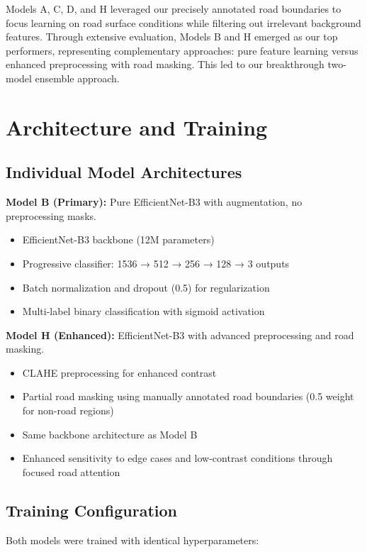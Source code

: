 \documentclass[12pt,twocolumn]{article}
\begin{document}
Models A, C, D, and H leveraged our precisely annotated road boundaries to focus learning on road surface conditions while filtering out irrelevant background features. Through extensive evaluation, Models B and H emerged as our top performers, representing complementary approaches: pure feature learning versus enhanced preprocessing with road masking. This led to our breakthrough two-model ensemble approach.

\section{Architecture and Training}

\subsection{Individual Model Architectures}

\textbf{Model B (Primary):} Pure EfficientNet-B3 with augmentation, no preprocessing masks.
\begin{itemize}[itemsep=1pt,parsep=0pt,topsep=2pt]
\item EfficientNet-B3 backbone (12M parameters)
\item Progressive classifier: 1536 → 512 → 256 → 128 → 3 outputs
\item Batch normalization and dropout (0.5) for regularization
\item Multi-label binary classification with sigmoid activation
\end{itemize}

\textbf{Model H (Enhanced):} EfficientNet-B3 with advanced preprocessing and road masking.
\begin{itemize}[itemsep=1pt,parsep=0pt,topsep=2pt]
\item CLAHE preprocessing for enhanced contrast
\item Partial road masking using manually annotated road boundaries (0.5 weight for non-road regions)
\item Same backbone architecture as Model B
\item Enhanced sensitivity to edge cases and low-contrast conditions through focused road attention
\end{itemize}

\subsection{Training Configuration}

Both models were trained with identical hyperparameters:
\end{document}
